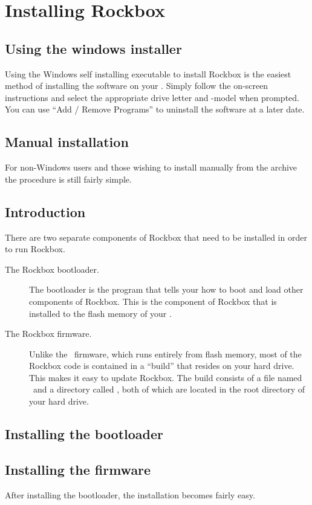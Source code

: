 \section{Installing Rockbox}\label{sec:installing_rockbox}

	{
	\subsection{Using the windows installer}
  Using the Windows self installing executable to install Rockbox is the 
  easiest method of installing the software on your \dap{}.  Simply follow the
  on-screen instructions and select the appropriate drive letter and 
  \dap{}-model when prompted.  You can use ``Add / Remove Programs'' to 
  uninstall the software at a later date.

  \subsection{Manual installation}
  For non{}-Windows users and those wishing to install manually from the archive
  the procedure is still fairly simple.
	}

	{
  \subsection{Introduction}
  
  There are two separate components of Rockbox that need to be installed in 
  order to run Rockbox.
  
  \begin{description}
  
  	\item[The Rockbox bootloader.] The bootloader is the program that tells your 
  	\dap{} how to boot and load other components of Rockbox. This is the 
  	component of Rockbox that is installed to the flash memory of your 
  	\playerman. 
  
  	\item[The Rockbox firmware.] Unlike the \playerman\ firmware, which runs 
  	entirely from flash memory, most of the Rockbox code is contained in a 
  	``build'' that resides on your \daps{} hard drive. This makes it easy to 
  	update Rockbox. The build consists of a file named \firmwarefilename\ and a 
  	directory called , both of which are located in the root 
  	directory of your hard drive.
    
  \end{description}
	
	\subsection{Installing the bootloader}

  \subsection{Installing the firmware} 
  	After installing the bootloader, the installation becomes fairly easy. 
	} 
	  
